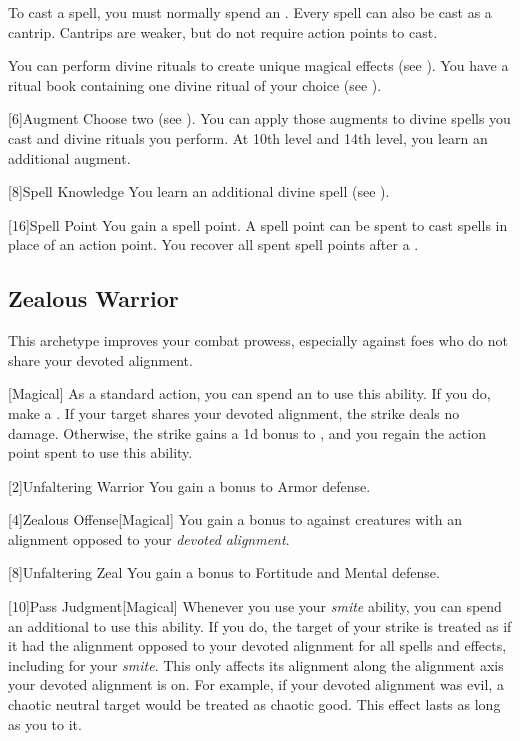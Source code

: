         To cast a spell, you must normally spend an .
        Every spell can also be cast as a cantrip.
        Cantrips are weaker, but do not require action points to cast.

        You can perform divine rituals to create unique magical effects (see ).
        You have a ritual book containing one divine ritual of your choice (see ).

        [6]{Augment}
        Choose two  (see ).
        You can apply those augments to divine spells you cast and divine rituals you perform.
        At 10th level and 14th level, you learn an additional augment.

        [8]{Spell Knowledge}
        You learn an additional divine spell (see ).

        [16]{Spell Point} 
        You gain a spell point.
        A spell point can be spent to cast spells in place of an action point.
        You recover all spent spell points after a .

    \subsection{Zealous Warrior}
        This archetype improves your combat prowess, especially against foes who do not share your devoted alignment.

        [Magical] As a standard action, you can spend an  to use this ability.
        If you do, make a .
        If your target shares your devoted alignment, the strike deals no damage.
        Otherwise, the strike gains a \plus1d bonus to , and you regain the action point spent to use this ability.

        [2]{Unfaltering Warrior}
        You gain a  bonus to Armor defense.

        [4]{Zealous Offense}[Magical]
        You gain a  bonus to  against creatures with an alignment opposed to your \textit{devoted alignment}.

        [8]{Unfaltering Zeal}
        You gain a  bonus to Fortitude and Mental defense.

        [10]{Pass Judgment}[Magical] Whenever you use your \textit{smite} ability, you can spend an additional  to use this ability.
        If you do, the target of your strike is treated as if it had the alignment opposed to your devoted alignment for all spells and effects, including for your \textit{smite}.
        This only affects its alignment along the alignment axis your devoted alignment is on.
        For example, if your devoted alignment was evil, a chaotic neutral target would be treated as chaotic good.
        This effect lasts as long as you  to it.

